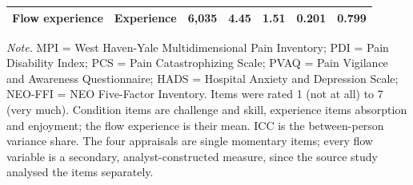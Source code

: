 \begin{table}[!htbp]
\begin{tabular*}{\textwidth}{@{\extracolsep{\fill}}llccccc@{}}
Flow experience & Experience & 6,035 & 4.45 & 1.51 & 0.201 & 0.799 \\
\bottomrule
\end{tabular*}
\par\vspace{3pt}\noindent\parbox{\textwidth}{\footnotesize\textit{Note.} MPI = West Haven-Yale Multidimensional Pain Inventory; PDI = Pain Disability Index; PCS = Pain Catastrophizing Scale; PVAQ = Pain Vigilance and Awareness Questionnaire; HADS = Hospital Anxiety and Depression Scale; NEO-FFI = NEO Five-Factor Inventory. Items were rated 1 (not at all) to 7 (very much). Condition items are challenge and skill, experience items absorption and enjoyment; the flow experience is their mean. ICC is the between-person variance share. The four appraisals are single momentary items; every flow variable is a secondary, analyst-constructed measure, since the source study analysed the items separately.}
\endgroup
\end{table}
